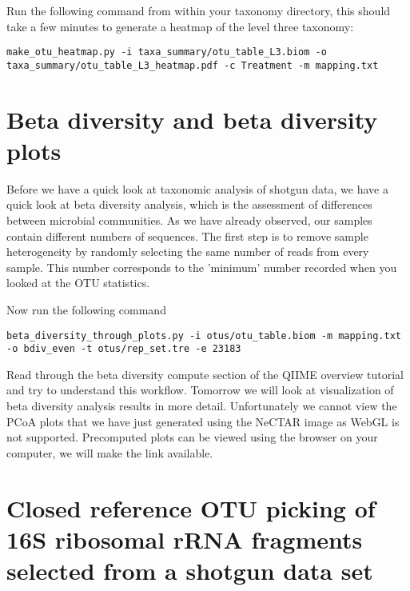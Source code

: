 \begin{steps}
Run the following command from within your taxonomy directory, this should take a few minutes to generate a heatmap of the level three taxonomy:
\begin{lstlisting}
make_otu_heatmap.py -i taxa_summary/otu_table_L3.biom -o taxa_summary/otu_table_L3_heatmap.pdf -c Treatment -m mapping.txt
\end{lstlisting}
\end{steps}

\section{Beta diversity and beta diversity plots}

Before we have a quick look at taxonomic analysis of shotgun data, we have a quick look at beta diversity analysis, which is the assessment of differences between microbial communities. As we have already observed, our samples contain different numbers of sequences. 
The first step is to remove sample heterogeneity by randomly selecting the same number of reads from every sample. This number corresponds to the 'minimum' number recorded when you looked at the OTU statistics. 

\begin{steps}
Now run the following command
\begin{lstlisting}
beta_diversity_through_plots.py -i otus/otu_table.biom -m mapping.txt -o bdiv_even -t otus/rep_set.tre -e 23183
\end{lstlisting}
\end{steps}

Read through the beta diversity compute section of the QIIME overview tutorial and try to understand this workflow. Tomorrow we will look at visualization of beta diversity analysis results in more detail. Unfortunately we cannot view the PCoA plots that we have just generated using the NeCTAR image as WebGL is not supported. Precomputed plots can be viewed using the browser on your computer, we will make the link available.

\section{Closed reference OTU picking of 16S ribosomal rRNA fragments selected from a shotgun data set}

